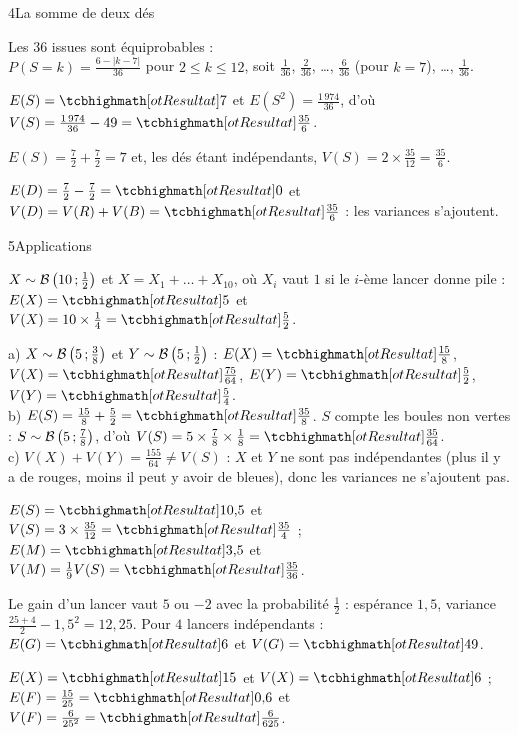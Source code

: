 \begin{deuxcolonnes}
\begin{corrige}{4}{La somme de deux dés}
\begin{questions}
  \item Les $36$ issues sont équiprobables :\\ $P(S=k)=\frac{6-|k-7|}{36}$ pour $2\leq k\leq12$, soit $\frac1{36}$, $\frac2{36}$, \dots,
    $\frac6{36}$ (pour $k=7$), \dots, $\frac1{36}$.
  \item $E(S)=\res{7}$ et $E\left(S^{2}\right)=\frac{1\,974}{36}$, d'où $V(S)=\frac{1\,974}{36}-49=\res{\frac{35}{6}}$.
  \item $E(S)=\frac72+\frac72=7$ et, les dés étant indépendants, $V(S)=2\times\frac{35}{12}=\frac{35}{6}$.
  \item $E(D)=\frac72-\frac72=\res{0}$ et $V(D)=V(R)+V(B)=\res{\frac{35}{6}}$ : les variances s'ajoutent.
\end{questions}
\end{corrige}

\end{deuxcolonnes}

\begin{corrige}{5}{Applications}
\begin{questions}
  \item $X\sim\mathcal{B}\left(10\,{;}\,\frac12\right)$ et $X=X_1+\dots+X_{10}$, où $X_i$ vaut $1$ si le $i$-ème lancer donne pile : $E(X)=\res{5}$
    et $V(X)=10\times\frac14=\res{\frac52}$.
  \item a) $X\sim\mathcal{B}\left(5\,{;}\,\frac38\right)$ et $Y\sim\mathcal{B}\left(5\,{;}\,\frac12\right)$ : $E(X)=\res{\frac{15}{8}}$, $V(X)=\res{\frac{75}{64}}$,
    $E(Y)=\res{\frac52}$, $V(Y)=\res{\frac54}$.\\
    b) $E(S)=\frac{15}{8}+\frac52=\res{\frac{35}{8}}$. $S$ compte les boules non vertes : $S\sim\mathcal{B}\left(5\,{;}\,\frac78\right)$, d'où
    $V(S)=5\times\frac78\times\frac18=\res{\frac{35}{64}}$.\\
    c) $V(X)+V(Y)=\frac{155}{64}\neq V(S)$ : $X$ et $Y$ ne sont pas indépendantes (plus il y a de rouges, moins il peut y avoir de bleues),
    donc les variances ne s'ajoutent pas.
  \item $E(S)=\res{10{,}5}$ et $V(S)=3\times\frac{35}{12}=\res{\frac{35}{4}}$ ; $E(M)=\res{3{,}5}$ et $V(M)=\frac19V(S)=\res{\frac{35}{36}}$.
  \item Le gain d'un lancer vaut $5$ ou $-2$ avec la probabilité $\frac12$ : espérance $1{,}5$, variance $\frac{25+4}{2}-1{,}5^{2}=12{,}25$.
    Pour $4$ lancers indépendants : $E(G)=\res{6}$ et $V(G)=\res{49}$.
  \item $E(X)=\res{15}$ et $V(X)=\res{6}$ ; $E(F)=\frac{15}{25}=\res{0{,}6}$ et $V(F)=\frac{6}{25^{2}}=\res{\frac{6}{625}}$.
\end{questions}
\end{corrige}

